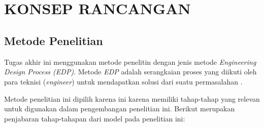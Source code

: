 
\chapter[KONSEP RANCANGAN]{\\ KONSEP RANCANGAN}

\section{Metode Penelitian}
Tugas akhir ini menggunakan metode penelitin dengan jenis metode \textit{Engineering Design Process (EDP)}. Metode \textit{EDP} adalah serangkaian proses yang diikuti oleh para teknisi (\textit{engineer}) untuk mendapatkan solusi dari suatu permasalahan \citep{scbuddies}.

Metode penelitian ini dipilih karena ini karena memiliki tahap-tahap yang relevan untuk digunakan dalam pengembangan penelitian ini. Berikut merupakan penjabaran tahap-tahapan dari model  pada penelitian ini:

